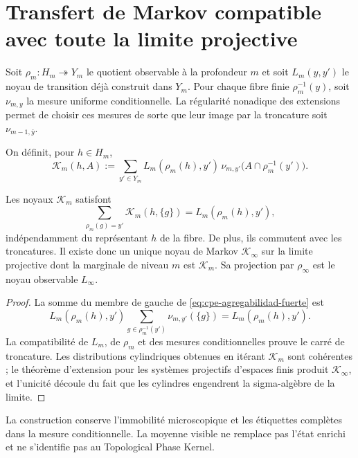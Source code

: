 \section{Transfert de Markov compatible avec toute la limite projective}
\label{sec:cpe-transferencia-limite-inverso}

Soit \(\rho_m:H_m\twoheadrightarrow Y_m\) le quotient observable à la profondeur
\(m\) et soit \(L_m(y,y')\) le noyau de transition déjà construit dans
\(Y_m\). Pour chaque fibre finie \(\rho_m^{-1}(y)\), soit
\(\nu_{m,y}\) la mesure uniforme conditionnelle. La régularité nonadique des
extensions permet de choisir ces mesures de sorte que leur image par la
troncature soit \(\nu_{m-1,\bar y}\).

On définit, pour \(h\in H_m\),
\begin{equation}
 \mathcal K_m(h,A)
 :=\sum_{y'\in Y_m}
 L_m(\rho_m(h),y')\,
 \nu_{m,y'}\bigl(A\cap\rho_m^{-1}(y')\bigr).
 \label{eq:cpe-kernel-lift-uniforme}
\end{equation}

\begin{theorem}
\label{thm:cpe-kernel-proyectivo}
Les noyaux \(\mathcal K_m\) satisfont
\begin{equation}
 \sum_{\rho_m(g)=y'}\mathcal K_m(h,\{g\})
 =L_m(\rho_m(h),y'),
 \label{eq:cpe-agregabilidad-fuerte}
\end{equation}
indépendamment du représentant \(h\) de la fibre. De plus, ils commutent avec
les troncatures. Il existe donc un unique noyau de Markov
\(\mathcal K_\infty\) sur la limite projective dont la marginale de niveau \(m\)
est \(\mathcal K_m\). Sa projection par \(\rho_\infty\) est le noyau
observable \(L_\infty\).
\end{theorem}

\begin{proof}
La somme du membre de gauche de
\eqref{eq:cpe-agregabilidad-fuerte} est
\[
 L_m(\rho_m(h),y')
 \sum_{g\in\rho_m^{-1}(y')}\nu_{m,y'}(\{g\})
 =L_m(\rho_m(h),y').
\]
La compatibilité de \(L_m\), de \(\rho_m\) et des mesures conditionnelles
prouve le carré de troncature. Les distributions cylindriques obtenues
en itérant \(\mathcal K_m\) sont cohérentes ; le théorème d'extension pour les
systèmes projectifs d'espaces finis produit \(\mathcal K_\infty\), et
l'unicité découle du fait que les cylindres engendrent la sigma-algèbre de la limite.
\end{proof}

La construction conserve l'immobilité microscopique et les étiquettes complètes
dans la mesure conditionnelle. La moyenne visible ne remplace pas l'état
enrichi et ne s'identifie pas au Topological Phase Kernel.


